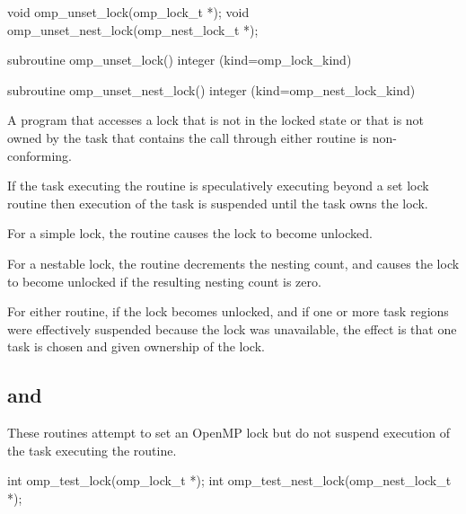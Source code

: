 \format
\ccppspecificstart
\begin{boxedcode}
void omp\_unset\_lock(omp\_lock\_t *);
void omp\_unset\_nest\_lock(omp\_nest\_lock\_t *);
\end{boxedcode}
\ccppspecificend

\fortranspecificstart
\begin{boxedcode}
subroutine omp\_unset\_lock()
integer (kind=omp\_lock\_kind) 

subroutine omp\_unset\_nest\_lock()
integer (kind=omp\_nest\_lock\_kind) 
\end{boxedcode}
\fortranspecificend

\constraints
A program that accesses a lock that is not in the locked state or that is not owned by the 
task that contains the call through either routine is non-conforming.

\effect
If the task executing the routine is speculatively executing beyond a
set lock routine then execution of the task is suspended until the task 
owns the lock.

For a simple lock, the  routine causes the lock to become unlocked.

For a nestable lock, the  routine decrements the nesting 
count, and causes the lock to become unlocked if the resulting nesting count is zero.

For either routine, if the lock becomes unlocked, and if one or more task 
regions were effectively suspended because the lock was unavailable, the 
effect is that one task is chosen and given ownership of the lock. 









\subsection{ and }
\label{subsec:omp_test_lock and omp_test_nest_lock}
\summary
These routines attempt to set an OpenMP lock but do not suspend execution of the task 
executing the routine.

\format
\ccppspecificstart
\begin{boxedcode}
int omp\_test\_lock(omp\_lock\_t *);
int omp\_test\_nest\_lock(omp\_nest\_lock\_t *);
\end{boxedcode}
\ccppspecificend

